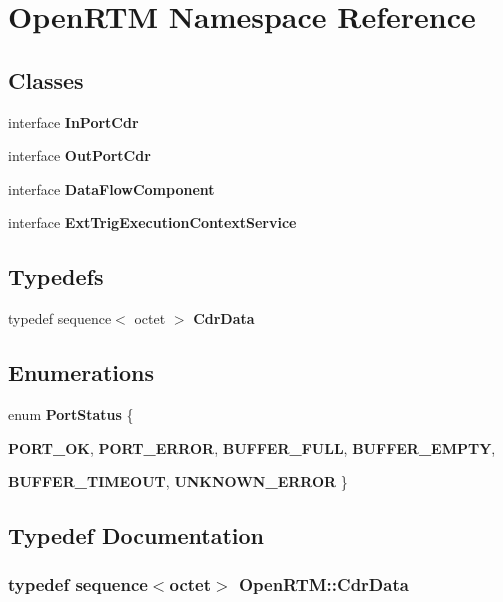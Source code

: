 \section{OpenRTM Namespace Reference}
\label{namespaceOpenRTM}
\subsection*{Classes}
\begin{DoxyCompactItemize}
\item 
interface {\bf InPortCdr}
\item 
interface {\bf OutPortCdr}
\item 
interface {\bf DataFlowComponent}
\item 
interface {\bf ExtTrigExecutionContextService}
\end{DoxyCompactItemize}
\subsection*{Typedefs}
\begin{DoxyCompactItemize}
\item 
typedef sequence$<$ octet $>$ {\bf CdrData}
\end{DoxyCompactItemize}
\subsection*{Enumerations}
\begin{DoxyCompactItemize}
\item 
enum {\bf PortStatus} \{ \par
{\bf PORT\_\-OK}, 
{\bf PORT\_\-ERROR}, 
{\bf BUFFER\_\-FULL}, 
{\bf BUFFER\_\-EMPTY}, 
\par
{\bf BUFFER\_\-TIMEOUT}, 
{\bf UNKNOWN\_\-ERROR}
 \}
\end{DoxyCompactItemize}


\subsection{Typedef Documentation}
\subsubsection[{CdrData}]{\setlength{\rightskip}{0pt plus 5cm}typedef sequence$<$octet$>$ {\bf OpenRTM::CdrData}}\label{namespaceOpenRTM_af5b607daef2b061583ed6fc579b62338}


